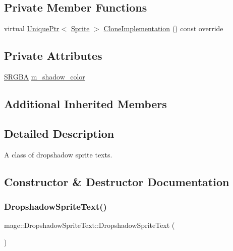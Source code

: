\subsection*{Private Member Functions}
\begin{DoxyCompactItemize}
\item 
virtual \hyperlink{namespacemage_a3316d7143a973e37adf1110f2e80ca31}{Unique\+Ptr}$<$ \hyperlink{classmage_1_1_sprite}{Sprite} $>$ \hyperlink{classmage_1_1_dropshadow_sprite_text_af997217dd243061e0490bbcd4bfde7ed}{Clone\+Implementation} () const override
\end{DoxyCompactItemize}
\subsection*{Private Attributes}
\begin{DoxyCompactItemize}
\item 
\hyperlink{structmage_1_1_s_r_g_b_a}{S\+R\+G\+BA} \hyperlink{classmage_1_1_dropshadow_sprite_text_a351565d8f023ddc53f486e048ad67e42}{m\+\_\+shadow\+\_\+color}
\end{DoxyCompactItemize}
\subsection*{Additional Inherited Members}


\subsection{Detailed Description}
A class of dropshadow sprite texts. 

\subsection{Constructor \& Destructor Documentation}
\hypertarget{classmage_1_1_dropshadow_sprite_text_a74003c0961117f9c04e2f4b70e71a74c}{}\label{classmage_1_1_dropshadow_sprite_text_a74003c0961117f9c04e2f4b70e71a74c} 
\subsubsection{\texorpdfstring{Dropshadow\+Sprite\+Text()}{DropshadowSpriteText()}\hspace{0.1cm}{\footnotesize\ttfamily [1/3]}}
{\footnotesize\ttfamily mage\+::\+Dropshadow\+Sprite\+Text\+::\+Dropshadow\+Sprite\+Text (\begin{DoxyParamCaption}{ }\end{DoxyParamCaption})}

